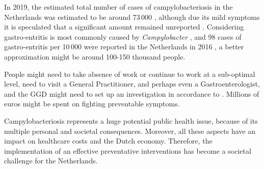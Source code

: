 In 2019, the estimated total number of cases of campylobacteriosis in the Netherlands was estimated to be around 73\,000 \parencite{lagerweij_disease_2020}, although due its mild symptoms it is speculated that a significant amount remained unreported \parencite{koutsoumanis_update_2020}. Considering gastro-entritis is most commonly caused by \textit{Campylobacter} \parencite{fouts_major_2005}, and 98 cases of gastro-entritis per 10\,000 were reported in the Netherlands in 2016 \parencite{van_pelt_jaarraport_2016}, a better approximation might be around 100-150 thousand people.

People might need to take absence of work or continue to work at a sub-optimal level, need to visit a General Practitioner, and perhaps even a Gastroenterologist, and the GGD might need to set up an investigation in accordance to . Millions of euros might be spent on fighting preventable symptoms.

Campylobacteriosis represents a huge potential public health issue, because of its multiple personal and societal consequences. Moreover, all these aspects have an impact on healthcare costs and the Dutch economy. Therefore, the implementation of an effective preventative interventions has become a societal challenge for the Netherlands.




